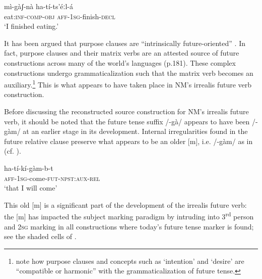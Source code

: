 \documentclass[output=paper]{langsci/langscibook}
\begin{document}
\ea\label{ex:mahland:76}
\gll mì-gàʃ-nà             ha-tí-ts'éːl-{\downstep}á \\
  eat:\textsc{inf-comp-obj}  \textsc{aff-1sg-}finish-\textsc{decl}   \\
  \glt `I finished eating.'
\z

It has been argued that purpose clauses are “intrinsically future-oriented” \citep[43]{Schmidtke-Bode2009}. In fact, purpose clauses and their matrix verbs are an attested source of future constructions across many of the world's languages (p.181). These complex constructions undergo grammaticalization such that the matrix verb becomes an auxiliary.\footnote{\citet[263-75]{BybeeEtAl1994} note how purpose clauses and concepts such as `intention' and `desire' are “compatible or harmonic” with the grammaticalization of future tense.} This is what appears to have taken place in NM's irrealis future verb construction. 

Before discussing the reconstructed source construction for NM's irrealis future verb, it should be noted that the future tense suffix /-gà/ appears to have been /-gàm/ at an earlier stage in its development. Internal irregularities found in the future relative clause preserve what appears to be an older [m], i.e. /-gàm/ as in  (cf. \citealt[10]{Ahland2014b}).

\ea\label{ex:mahland:77}
\gll ha-tí-kí-gàm-b-t\\
  \textsc{aff-1sg}{}-come-\textsc{fut-npst:aux-rel}\\\glt `that I will come'
\z

This old [m] is a significant part of the development of the irrealis future verb: the [m] has impacted the subject marking paradigm by intruding into 3\textsuperscript{rd} person and \textsc{2sg} marking in all constructions where today's future tense marker is found; see the shaded cells of . 
\end{document}
